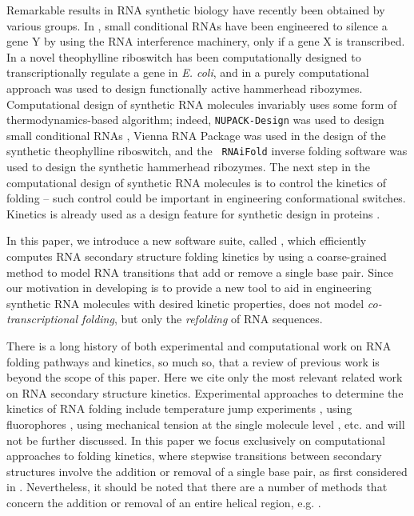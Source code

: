 Remarkable results in RNA synthetic biology have recently been
obtained by various groups. In \citep{Hochrein.jacs13}, small
conditional RNAs have been engineered to silence a gene Y by using the
RNA interference machinery, only if a gene X is transcribed. In
\citep{Wachsmuth.nar13} a novel theophylline riboswitch has been
computationally designed to transcriptionally regulate a gene in {\em
E. coli}, and in \citep{syntheticHammerheads} a purely computational
approach was used to design functionally active hammerhead ribozymes.
Computational design of synthetic RNA molecules invariably uses some
form of thermodynamics-based algorithm; indeed, {\tt NUPACK-Design}
\citep{Zadeh.jcc11} was used to design small conditional RNAs
\citep{Hochrein.jacs13}, Vienna RNA Package \citep{Gruber08} was used in
the design of the synthetic theophylline riboswitch, and the {\tt
RNAiFold} inverse folding software
\citep{garcia.JBCBB13,GarciaMartin.nar13} was used to design the
synthetic hammerhead ribozymes. The next step in the computational
design of synthetic RNA molecules is to control the kinetics of
folding -- such control could be important in engineering
conformational switches. Kinetics is already used as a design feature
for synthetic design in proteins \citep{Bujotzek.jcam11,Fasting.acie12}.

In this paper, we introduce a new software suite, called \hermes,
which efficiently computes RNA secondary structure
folding kinetics by using a coarse-grained
method to model RNA transitions that add or remove a single base pair.
Since our motivation in developing \hermes is to provide a new
tool to aid in engineering synthetic RNA molecules with desired
kinetic properties, \hermes does not model {\em co-transcriptional
folding}, but only the {\em refolding} of RNA sequences.

There is a long history of both experimental and computational work on
RNA folding pathways and kinetics, so much so, that a review of
previous work is beyond the scope of this paper. Here we cite only the
most relevant related work on RNA secondary structure
kinetics. Experimental approaches to
determine the kinetics of RNA folding include temperature jump
experiments \citep{lecuyerCrothers}, using fluorophores
\citep{Hobartner.jmb03}, using mechanical tension at the single
molecule level \citep{Vieregg.mp06}, etc. and will not be further
discussed. In this paper we focus exclusively on computational
approaches to folding kinetics, where stepwise transitions between
secondary structures involve the addition or removal of a single base
pair, as first considered in \citep{flammHofacker}.
Nevertheless, it should be noted that there are a number of
methods that concern the addition or removal of an entire helical
region, e.g. \citep{Huang.bb14,Zhao.jcp11}.

